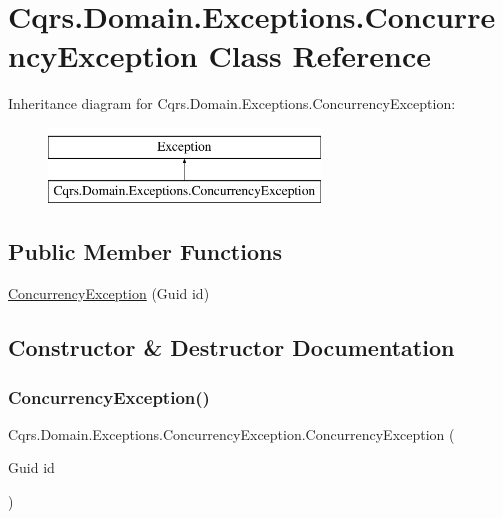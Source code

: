 \hypertarget{classCqrs_1_1Domain_1_1Exceptions_1_1ConcurrencyException}{}\section{Cqrs.\+Domain.\+Exceptions.\+Concurrency\+Exception Class Reference}
\label{classCqrs_1_1Domain_1_1Exceptions_1_1ConcurrencyException}
Inheritance diagram for Cqrs.\+Domain.\+Exceptions.\+Concurrency\+Exception\+:\begin{figure}[H]
\begin{center}
\leavevmode
\includegraphics[height=2.000000cm]{classCqrs_1_1Domain_1_1Exceptions_1_1ConcurrencyException}
\end{center}
\end{figure}
\subsection*{Public Member Functions}
\begin{DoxyCompactItemize}
\item 
\hyperlink{classCqrs_1_1Domain_1_1Exceptions_1_1ConcurrencyException_aed52d2484adb911db51fd50f18f3e477_aed52d2484adb911db51fd50f18f3e477}{Concurrency\+Exception} (Guid id)
\end{DoxyCompactItemize}


\subsection{Constructor \& Destructor Documentation}
\mbox{\label{classCqrs_1_1Domain_1_1Exceptions_1_1ConcurrencyException_aed52d2484adb911db51fd50f18f3e477_aed52d2484adb911db51fd50f18f3e477}} 
\subsubsection{\texorpdfstring{Concurrency\+Exception()}{ConcurrencyException()}}
{\footnotesize\ttfamily Cqrs.\+Domain.\+Exceptions.\+Concurrency\+Exception.\+Concurrency\+Exception (\begin{DoxyParamCaption}\item[{Guid}]{id }\end{DoxyParamCaption})}

